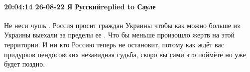  
 
 
 
 

\paragraph{20:04:14 26-08-22 Я Русскийreplied to Сауле}

Не неси чушь . Россия просит граждан Украины чтобы как можно больше из Украины
выехали за пределы ее . Что бы меньше произошло жертв на этой территории. И ни
кто Россию теперь не остановит, потому как ждёт вас придурков пендосовских
незавидная судьба, скоро вы сами это поймёте но уже будет поздно.
